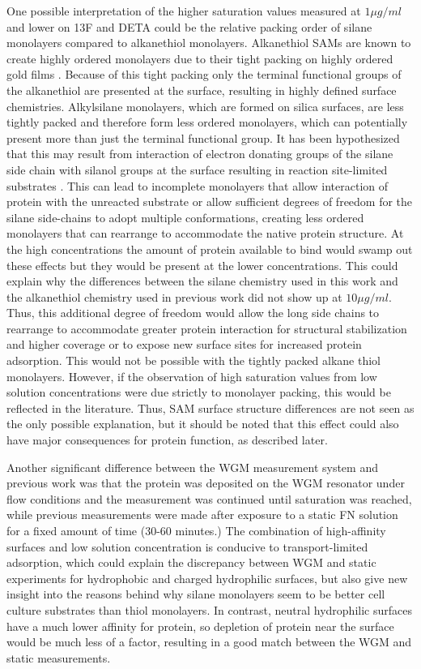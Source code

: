 One possible interpretation of the higher saturation values measured
at $1\mu g/ml$ and lower on 13F and DETA could be the relative packing
order of silane monolayers compared to alkanethiol monolayers. Alkanethiol
SAMs are known to create highly ordered monolayers due to their tight
packing on highly ordered gold films \cite{Prime1991}. Because of
this tight packing only the terminal functional groups of the alkanethiol
are presented at the surface, resulting in highly defined surface
chemistries. Alkylsilane monolayers, which are formed on silica surfaces,
are less tightly packed and therefore form less ordered monolayers,
which can potentially present more than just the terminal functional
group. It has been hypothesized that this may result from interaction
of electron donating groups of the silane side chain with silanol
groups at the surface resulting in reaction site-limited substrates
\cite{Stenger1992}. This can lead to incomplete monolayers that allow
interaction of protein with the unreacted substrate or allow sufficient
degrees of freedom for the silane side-chains to adopt multiple conformations,
creating less ordered monolayers that can rearrange to accommodate
the native protein structure. At the high concentrations the amount
of protein available to bind would swamp out these effects but they
would be present at the lower concentrations. This could explain why
the differences between the silane chemistry used in this work and
the alkanethiol chemistry used in previous work \cite{Keselowsky2003}
did not show up at $10\mu g/ml$. Thus, this additional degree of
freedom would allow the long side chains to rearrange to accommodate
greater protein interaction for structural stabilization and higher
coverage or to expose new surface sites for increased protein adsorption.
This would not be possible with the tightly packed alkane thiol monolayers.
However, if the observation of high saturation values from low solution
concentrations were due strictly to monolayer packing, this would
be reflected in the literature. Thus, SAM surface structure differences
are not seen as the only possible explanation, but it should be noted
that this effect could also have major consequences for protein function,
as described later. 

Another significant difference between the WGM measurement system
and previous work was that the protein was deposited on the WGM resonator
under flow conditions and the measurement was continued until saturation
was reached, while previous measurements were made after exposure
to a static FN solution for a fixed amount of time (30-60 minutes.)
The combination of high-affinity surfaces and low solution concentration
is conducive to transport-limited adsorption, which could explain
the discrepancy between WGM and static experiments for hydrophobic
and charged hydrophilic surfaces, but also give new insight into the
reasons behind why silane monolayers seem to be better cell culture
substrates than thiol monolayers. In contrast, neutral hydrophilic
surfaces have a much lower affinity for protein, so depletion of protein
near the surface would be much less of a factor, resulting in a good
match between the WGM and static measurements. 

